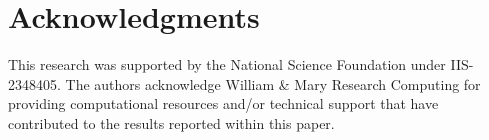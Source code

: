\section{Acknowledgments}
This research was supported by the National Science Foundation under IIS-2348405. The authors acknowledge William \& Mary Research Computing for providing computational resources and/or technical support that have contributed to the results reported within this paper.
